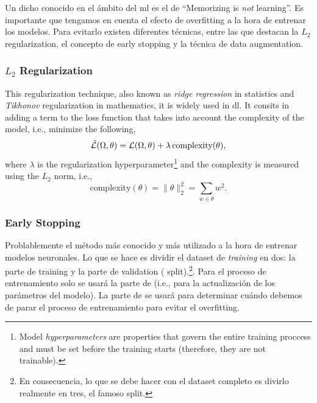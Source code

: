 Un dicho conocido en el ámbito del \gls{ml} es el de ``Memorizing is \emph{not}
learning''. Es importante que tengamos en cuenta el efecto de overfitting a la
hora de entrenar los modelos. Para evitarlo existen diferentes técnicas, entre
las que destacan la \(L_2\) regularization, el concepto de early stopping y la
técnica de data augmentation.

\subsubsection{\(L_2\) Regularization}
This regularization technique, also known as \emph{ridge
  regression} in statistics and
\emph{Tikhonov} regularization in mathematics, it is
widely used in \gls{dl}. It consits in adding a term to the loss function that
takes into account the complexity of the model, i.e., minimize the following,
\begin{equation}
  \hat{\mathcal{L}}(\Omega, \theta) =
  \mathcal{L}(\Omega, \theta) + \lambda\,\text{complexity}(\theta),
\end{equation}
where \(\lambda\) is the regularization hyperparameter\footnote{Model
  \emph{hyperparameters} are properties that govern the entire training
  proccess and must be set before the training starts (therefore, they are not
  trainable).} and the complexity is measured using the
\(L_2\) norm, i.e.,
\begin{equation}
  \text{complexity}(\theta) = \lVert\theta\rVert_2^2 = \sum_{w \in \theta} w^2.
\end{equation}

\subsubsection{Early Stopping}
Problablemente el método más conocido y más utilizado a la hora de entrenar
modelos neuronales. Lo que se hace es dividir el dataset de \emph{training} en
dos: la parte de training y la parte de validation
( split).\footnote{En consecuencia, lo que se debe hacer con el
  dataset completo es divirlo realmente en tres, el famoso
   split.}. Para el proceso de entrenamiento solo se usará
la parte de  (i.e., para la actualización de los parámetros del
modelo). La parte de  se usará para determinar cuándo debemos de
parar el proceso de entrenamiento para evitar el
overfitting.

